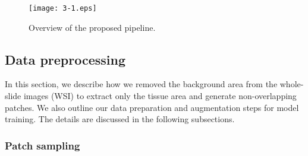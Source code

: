 \begin{figure}[!ht]
\centering
\texttt{[image: 3-1.eps]}
\caption{Overview of the proposed pipeline.}
\label{fig:3-1}
\end{figure}

\subsection{Data preprocessing}\label{se:3-3.1}

In this section, we describe how we removed the background area from the whole-slide images (WSI) to extract only the tissue area and generate non-overlapping patches. We also outline our data preparation and augmentation steps for model training. The details are discussed in the following subsections.

\subsubsection{Patch sampling}\label{se:3-3.1.1}

